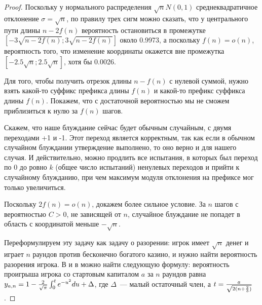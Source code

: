 \begin{proof}
Поскольку у нормального распределения $\sqrt {n} N(0,1)$ среднеквадратичное отклонение $\sigma = \sqrt{n}$, по правилу трех сигм можно сказать, что у центрального пути длины $n-2f(n)$ вероятность остановиться в промежутке $[-3\sqrt{n-2f(n)}; 3\sqrt{n-2f(n)}]$ около 0.9973, а поскольку $f(n)=o(n)$, вероятность того, что изменение координаты окажется вне промежутка $[-2.5\sqrt{n}; 2.5\sqrt{n}]$, хотя бы 0.0026. %

Для того, чтобы получить отрезок длины $n-f(n)$ с нулевой суммой, нужно взять какой-то суффикс префикса длины $f(n)$ и какой-то префикс суффикса длины $f(n)$. Покажем, что с достаточной вероятностью мы не сможем приблизиться к нулю за $f(n)$ шагов.

Скажем, что наше блуждание сейчас будет обычным случайным, с двумя переходами +1 и -1. Этот переход является корректным, так как если в обычном случайном блуждании утверждение выполнено, то оно верно и для нашего случая. И действительно, можно продлить все испытания, в которых был переход по 0 до ровно $k$ (общее число испытаний) ненулевых переходов и прийти к случайному блужданию, при чем максимум модуля отклонения на префиксе мог только увеличиться.


Поскольку $2f(n)=o(n)$, докажем более сильное условие. За $n$ шагов с вероятностью $C>0$, не зависящей от $n$, случайное блуждание не попадет в область с координатой меньше $-\sqrt{n}$. 

Переформулируем эту задачу как задачу о разорении: игрок имеет $\sqrt{n}$ денег и играет $n$ раундов против бесконечно богатого казино, и нужно найти вероятность разорения игрока. В \cite{7} и в \cite{8} можно найти следующую формулу: вероятность проигрыша игрока со стартовым капиталом $a$ за $n$ раундов равна $y_{a,n}=1-{{2} \over {\sqrt{\pi}}} \int_0^t e^{-u^2} du + \Delta$, где $\Delta$~--- малый остаточный член, а $t={{a} \over {\sqrt{2(n+{{2}\over 3})}}}$.


\end{proof}
